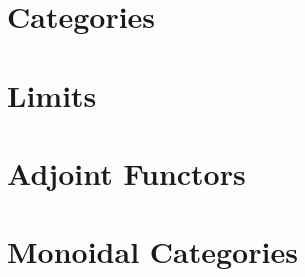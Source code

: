 \documentclass[../../deep-dive]{subfiles}
\begin{document}
\chapter{Categories}





\chapter{Limits}



\chapter{Adjoint Functors}



\chapter{Monoidal Categories}


\end{document}
